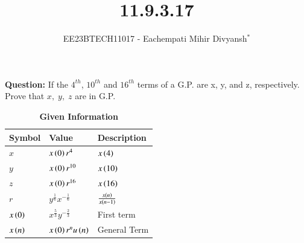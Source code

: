 \documentclass[journal,12pt,twocolumn]{IEEEtran}
\theoremstyle{remark}
\begin{document}

\vspace{3cm}

\title{11.9.3.17}
\author{EE23BTECH11017 - Eachempati Mihir Divyansh$^{*}$%
}
\maketitle
\newpage
\bigskip

\renewcommand{\thefigure}{\theenumi}
\renewcommand{\thetable}{\theenumi}

\textbf{Question: }
If the $4^{th}$, $10^{th}$ and $16^{th}$ terms of a G.P. are x, y, and z, respectively. Prove that $x,\; y,\; z$ are in G.P.


\begin{table}[h]
    \renewcommand\thetable{1}
        \centering
	        \caption{\textbf{Given Information}}
		    \begin{tabular}{|m{2cm}|m{2cm}|m{2cm}|}
		        \hline
			    \textbf{Symbol} & \textbf{Value} & \textbf{Description}\\ [1ex]
			        \hline
				        $x$ & $x\left(0\right)r^4$ & $x\left(4\right)$ \\ [1ex]
					    \hline
					            $y$ & $x\left(0\right)r^{10}$ & $x\left(10\right)$\\ [1ex]
						        \hline
							        $z$ & $x\left(0\right)r^{16}$ & $x\left(16\right)$\\ [1ex]
								    \hline
								            $r$ & $y^{\frac{1}{6}}x^{-\frac{1}{6}}$ & $\frac{x\left(n\right)}{x\left(n-1\right)}$\\[1ex]
									        \hline \vspace{0.1cm}
										        $x\left(0\right)$ & $x^{\frac{5}{3}}y^{-\frac{2}{3}}$ & First term \\[1ex]
											    \hline
												    $x\left(n\right)$ & $x\left(0\right)r^nu\left(n\right)$ & General Term \\ [1ex]

\hline  \end{tabular}\label{Table 1}
\end{table} 

													    \solution
\end{document}
